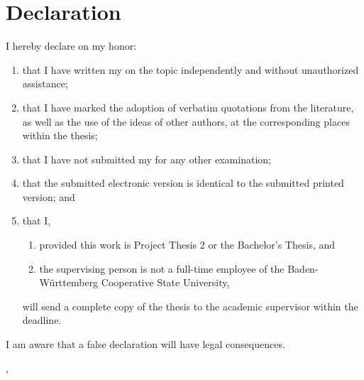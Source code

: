 
\thispagestyle{empty}

\section*{Declaration}
\vspace*{2em}

I hereby declare on my honor: \\
\begin{enumerate}
\item that I have written my {\arbeitsart} on the topic
{\itshape \titel } independently and without unauthorized assistance;
\item that I have marked the adoption of verbatim quotations from the literature, as well as the use of the ideas
of other authors, at the corresponding places within the thesis;
\item that I have not submitted my {\arbeitsart} for any other examination;
\item that the submitted electronic version is identical to the submitted printed version; and
\item that I,
    \begin{enumerate}
        \item provided this work is Project Thesis 2 or the Bachelor's Thesis, and
        \item the supervising person is not a full-time employee of the Baden-Württemberg Cooperative State University,
    \end{enumerate}
will send a complete copy of the thesis to the academic supervisor within the deadline.
\end{enumerate}

I am aware that a false declaration will have legal consequences.

\vspace{3em}

\abgabeort, \datumAbgabe
\vspace{4em}

\autor